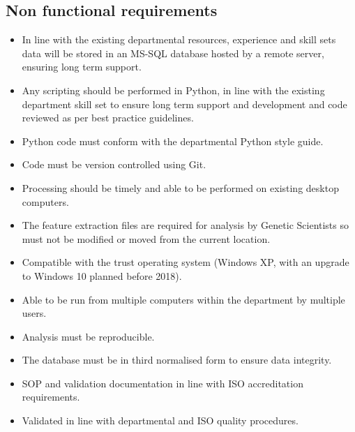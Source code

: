 \subsection{Non functional requirements}
\begin{itemize}
\item In line with the existing departmental resources, experience and skill sets data will be stored in an MS-SQL database hosted by a remote server, ensuring long term support.
\item Any scripting should be performed in Python, in line with the existing department skill set to ensure long term support and development and code reviewed as per best practice guidelines. 
\item Python code must conform with the departmental Python style guide.
\item Code must be version controlled using Git.
\item Processing should be timely and able to be performed on existing desktop computers.
\item The feature extraction files are required for analysis by Genetic Scientists so must not be modified or moved from the current location.
\item Compatible with the trust operating system (Windows XP, with an upgrade to Windows 10 planned before 2018).
\item Able to be run from multiple computers within the department by multiple users.
\item Analysis must be reproducible.
\item The database must be in third normalised form to ensure data integrity.
\item \ac{SOP} and validation documentation in line with ISO accreditation requirements.
\item Validated in line with departmental and ISO quality procedures.
\end{itemize}
